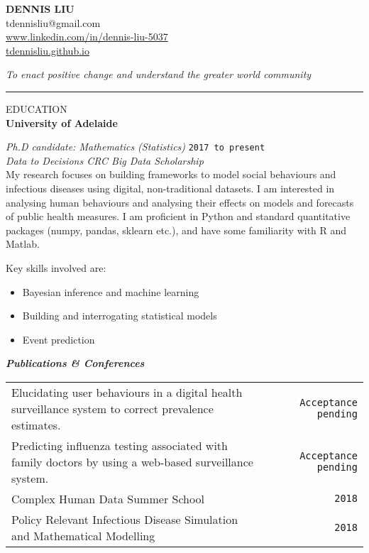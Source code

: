 \documentclass{article}
\newcommand{\HRule}{\rule{\linewidth}{0.5mm}}
\begin{document}
\begin{center} 

\textbf{\huge{DENNIS LIU}}
\\[0.7cm]

tdennisliu@gmail.com \\
\url{www.linkedin.com/in/dennis-liu-5037} \\
\url{tdennisliu.github.io}

\end{center}
\emph{To enact positive change and understand the greater world community} 


\HRule

{\footnotesize EDUCATION}
\\

\textbf{\large University of Adelaide} 

\emph{Ph.D candidate: Mathematics (Statistics)} \hfill \texttt{2017 to present}\\[0.2cm]
\footnotesize{\emph{Data to Decisions CRC Big Data Scholarship}}\\

My research focuses on building frameworks to model social behaviours and infectious diseases using digital, non-traditional datasets. I am interested in analysing human behaviours and analysing their effects on models and forecasts of public health measures. I am proficient in Python and standard quantitative packages (numpy, pandas, sklearn etc.), and have some familiarity with R and Matlab.

Key skills involved are:

\begin{itemize}
	\item Bayesian inference and machine learning
	\item Building and interrogating statistical models
	\item Event prediction
\end{itemize}

\textbf{\emph{Publications \& Conferences}}
\begin{table}[h!] \small
\begin{tabular}{ p{12.1cm} c r}
	
 Elucidating user behaviours in a digital health surveillance system to correct prevalence estimates. & & \texttt{Acceptance pending} \\

 Predicting influenza testing associated with family doctors by using a web-based surveillance system. & & \texttt{Acceptance pending} \\

 Complex Human Data Summer School & & \texttt{2018} \\
 Policy Relevant Infectious Disease Simulation and Mathematical Modelling& & \texttt{2018} \\

\end{tabular}
\end{table}
\end{document}
